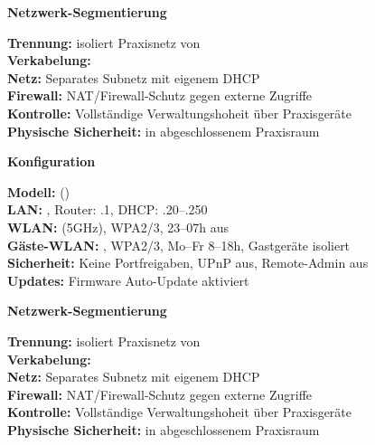 \begin{landscape}
    \vspace{0.5cm}
    \textbf{\large Netzwerk-Segmentierung}\\
    \begin{small}
      \textbf{Trennung:} \RouterModell{} isoliert Praxisnetz von \StandortTyp{}\\
      \textbf{Verkabelung:} \NetzwerkUplink{}\\
      \textbf{Netz:} Separates Subnetz \PraxisSubnetz{} mit eigenem DHCP\\
      \textbf{Firewall:} NAT/Firewall-Schutz gegen externe Zugriffe\\
      \textbf{Kontrolle:} Vollständige Verwaltungshoheit über Praxisgeräte\\
      \textbf{Physische Sicherheit:} \RouterKurz{} in abgeschlossenem Praxisraum
    \end{small}
  \else
    \begin{minipage}[t]{0.5\textwidth}
      \textbf{\large \RouterKurz{} Konfiguration}\\
      \begin{small}
        \textbf{Modell:} \RouterModell{} (\RouterName)\\
        \textbf{LAN:} \PraxisSubnetz{}, Router: .1, DHCP: .20–.250\\
        \textbf{WLAN:} \WLANName{} (5GHz), WPA2/3, 23–07h aus\\
        \textbf{Gäste-WLAN:} \WLANGastName, WPA2/3, Mo–Fr 8–18h, Gastgeräte isoliert\\
        \textbf{Sicherheit:} Keine Portfreigaben, UPnP aus, Remote-Admin aus\\
        \textbf{Updates:} Firmware Auto-Update aktiviert
      \end{small}
    \end{minipage}
    \hfill
    \begin{minipage}[t]{0.49\textwidth}
      \textbf{\large Netzwerk-Segmentierung}\\
      \begin{small}
        \textbf{Trennung:} \RouterModell{} isoliert Praxisnetz von \StandortTyp{}\\
        \textbf{Verkabelung:} \NetzwerkUplink{}\\
        \textbf{Netz:} Separates Subnetz \PraxisSubnetz{} mit eigenem DHCP\\
        \textbf{Firewall:} NAT/Firewall-Schutz gegen externe Zugriffe\\
        \textbf{Kontrolle:} Vollständige Verwaltungshoheit über Praxisgeräte\\
        \textbf{Physische Sicherheit:} \RouterKurz{} in abgeschlossenem Praxisraum
      \end{small}
    \end{minipage}
  \fi

\end{landscape}